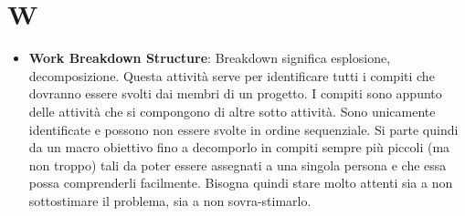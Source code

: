 %
%
%
%

\section{W}

\begin{itemize}
	\item \textbf{Work Breakdown Structure}: Breakdown significa esplosione, decomposizione. Questa attività serve per identificare tutti i compiti che dovranno essere svolti dai membri di un progetto. I compiti sono appunto delle attività che si compongono di altre sotto attività. Sono unicamente identificate e possono non essere svolte in ordine sequenziale. \newline
Si parte quindi da un macro obiettivo fino a decomporlo in compiti sempre più piccoli (ma non troppo) tali da poter essere assegnati a una singola persona e che essa possa comprenderli facilmente. \newline
Bisogna quindi stare molto attenti sia a non sottostimare il problema, sia a non sovra-stimarlo.

\end{itemize}